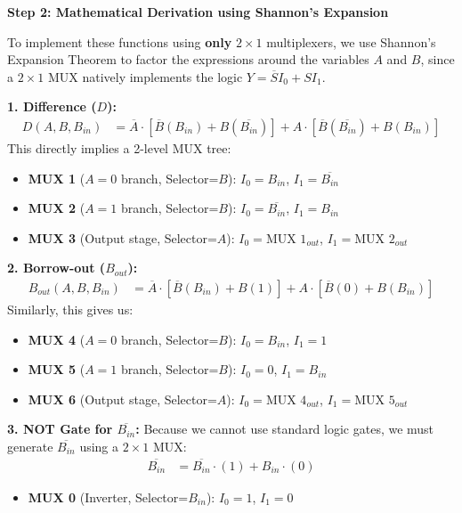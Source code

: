 \documentclass[12pt,a3paper]{article}
\begin{document}
\begin{enumerate}
\begin{tcolorbox}[enhanced,breakable,ansbox,colback=cD!4,colframe=cD,boxrule=0.8pt,arc=5pt,title={\textbf{Answer}},fonttitle=\bfseries\color{white},colbacktitle=cD]
\textbf{Step 2: Mathematical Derivation using Shannon's Expansion}

To implement these functions using \textbf{only} $2\times1$ multiplexers, we use Shannon's Expansion Theorem to factor the expressions around the variables $A$ and $B$, since a $2\times1$ MUX natively implements the logic $Y = \overline{S}I_0 + SI_1$.

\vspace{0.3cm}
\textbf{1. Difference ($D$):}
\begin{align*}
D(A, B, B_{in}) &= \overline{A} \cdot \left[ \overline{B}(B_{in}) + B(\overline{B_{in}}) \right] + A \cdot \left[ \overline{B}(\overline{B_{in}}) + B(B_{in}) \right]
\end{align*}
This directly implies a 2-level MUX tree:
\begin{itemize}
    \item \textbf{MUX 1} ($A=0$ branch, Selector=$B$): $I_0 = B_{in}$, $I_1 = \overline{B_{in}}$
    \item \textbf{MUX 2} ($A=1$ branch, Selector=$B$): $I_0 = \overline{B_{in}}$, $I_1 = B_{in}$
    \item \textbf{MUX 3} (Output stage, Selector=$A$): $I_0 = \text{MUX 1}_{out}$, $I_1 = \text{MUX 2}_{out}$
\end{itemize}

\vspace{0.2cm}
\textbf{2. Borrow-out ($B_{out}$):}
\begin{align*}
B_{out}(A, B, B_{in}) &= \overline{A} \cdot \left[ \overline{B}(B_{in}) + B(1) \right] + A \cdot \left[ \overline{B}(0) + B(B_{in}) \right]
\end{align*}
Similarly, this gives us:
\begin{itemize}
    \item \textbf{MUX 4} ($A=0$ branch, Selector=$B$): $I_0 = B_{in}$, $I_1 = 1$
    \item \textbf{MUX 5} ($A=1$ branch, Selector=$B$): $I_0 = 0$, $I_1 = B_{in}$
    \item \textbf{MUX 6} (Output stage, Selector=$A$): $I_0 = \text{MUX 4}_{out}$, $I_1 = \text{MUX 5}_{out}$
\end{itemize}

\vspace{0.2cm}
\textbf{3. NOT Gate for $\overline{B_{in}}$:}
Because we cannot use standard logic gates, we must generate $\overline{B_{in}}$ using a $2\times1$ MUX:
\begin{align*}
\overline{B_{in}} &= \overline{B_{in}}\cdot(1) + B_{in}\cdot(0)
\end{align*}
\begin{itemize}
    \item \textbf{MUX 0} (Inverter, Selector=$B_{in}$): $I_0 = 1$, $I_1 = 0$
\end{itemize}


\end{tcolorbox}
\end{enumerate}
\end{document}
